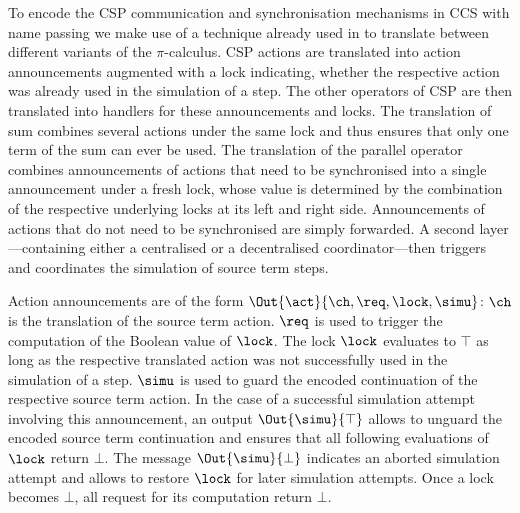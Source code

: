 \documentclass[copyright,creativecommons]{eptcs}
\begin{document}
To encode the CSP communication and synchronisation mechanisms in CCS with name passing we make use of a technique already used in \cite{petersNestmann12, peters12} to translate between different variants of the $ \pi $-calculus. CSP actions are translated into action announcements augmented with a lock indicating, whether the respective action was already used in the simulation of a step. The other operators of CSP are then translated into handlers for these announcements and locks.
The translation of sum combines several actions under the same lock and thus ensures that only one term of the sum can ever be used.
The translation of the parallel operator combines announcements of actions that need to be synchronised into a single announcement under a fresh lock, whose value is determined by the combination of the respective underlying locks at its left and right side. Announcements of actions that do not need to be synchronised are simply forwarded.
A second layer---containing either a centralised or a decentralised coordinator---then triggers and coordinates the simulation of source term steps.

Action announcements are of the form $ \Out{\act}{\ch, \req, \lock, \simu} $: $ \ch $ is the translation of the source term action. $ \req $ is used to trigger the computation of the Boolean value of $ \lock $. The lock $ \lock $ evaluates to $ \top $ as long as the respective translated action was not successfully used in the simulation of a step. $ \simu $ is used to guard the encoded continuation of the respective source term action. In the case of a successful simulation attempt involving this announcement, an output $ \Out{\simu}{\top} $ allows to unguard the encoded source term continuation and ensures that all following evaluations of $ \lock $ return $ \bot $. The message $ \Out{\simu}{\bot} $ indicates an aborted simulation attempt and allows to restore $ \lock $ for later simulation attempts. Once a lock becomes $ \bot $, all request for its computation return $ \bot $.
\end{document}
